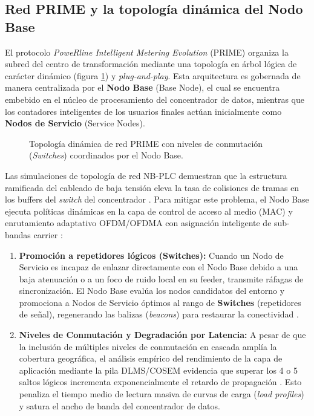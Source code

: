\subsection{Red PRIME y la topología dinámica del Nodo Base}
\label{subsec:estructura_PRIME}
El protocolo \textit{PoweRline Intelligent Metering Evolution} (PRIME) organiza la subred del centro de transformación mediante una topología en árbol lógica de carácter dinámico (figura \ref{fig:prime_topology}) y \textit{plug-and-play}. Esta arquitectura es gobernada de manera centralizada por el \textbf{Nodo Base} (Base Node), el cual se encuentra embebido en el núcleo de procesamiento del concentrador de datos, mientras que los contadores inteligentes de los usuarios finales actúan inicialmente como \textbf{Nodos de Servicio} (Service Nodes).

\begin{figure}[ht]
    \centering
    \caption{Topología dinámica de red PRIME con niveles de conmutación (\textit{Switches}) coordinados por el Nodo Base.}
    \label{fig:prime_topology}
\end{figure}

Las simulaciones de topología de red NB-PLC demuestran que la estructura ramificada del cableado de baja tensión eleva la tasa de colisiones de tramas en los buffers del \textit{switch} del concentrador \cite{8704772}. Para mitigar este problema, el Nodo Base ejecuta políticas dinámicas en la capa de control de acceso al medio (MAC) y enrutamiento adaptativo OFDM/OFDMA con asignación inteligente de sub-bandas carrier \cite{8362574}:
\begin{enumerate}
    \item \textbf{Promoción a repetidores lógicos (Switches):} Cuando un Nodo de Servicio es incapaz de enlazar directamente con el Nodo Base debido a una baja atenuación o a un foco de ruido local en su feeder, transmite ráfagas de sincronización. El Nodo Base evalúa los nodos candidatos del entorno y promociona a Nodos de Servicio óptimos al rango de \textbf{Switches} (repetidores de señal), regenerando las balizas (\textit{beacons}) para restaurar la conectividad \cite{8693361}.
    \item \textbf{Niveles de Conmutación y Degradación por Latencia:} A pesar de que la inclusión de múltiples niveles de conmutación en cascada amplía la cobertura geográfica, el análisis empírico del rendimiento de la capa de aplicación mediante la pila DLMS/COSEM evidencia que superar los 4 o 5 saltos lógicos incrementa exponencialmente el retardo de propagación \cite{7778783}. Esto penaliza el tiempo medio de lectura masiva de curvas de carga (\textit{load profiles}) y satura el ancho de banda del concentrador de datos.
\end{enumerate}

